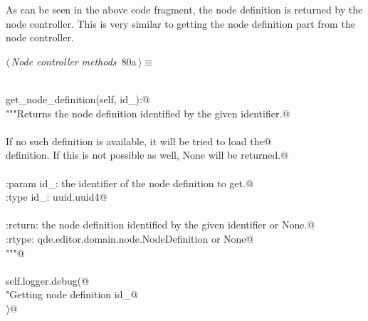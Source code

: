 \documentclass[
    a4paper,      %
    10pt,         %
    openright,    %
    notitlepage,  %
    parskip=half, %
]{scrreprt}       %
\theoremstyle{definition}                    %
\begin{document}
\begin{flushleft}
\begin{minipage}{\linewidth}
\begin{list}{}{\setlength{\itemsep}{-\parsep}\setlength{\itemindent}{-\leftmargin}}
\item{}
\end{list}
\end{minipage}\vspace{4ex}
\end{flushleft}
As can be seen in the above code fragment, the node definition is returned by
the node controller. This is very similar to getting the node definition part
from the node controller.

\begin{flushleft} \small
\begin{minipage}{\linewidth}\label{scrap131}\raggedright\small
{} $\langle\,${\itshape Node controller methods}\nobreak\ {\footnotesize {80a}}$\,\rangle\equiv$
\vspace{-1exm}
\begin{list}{}{} \item
\mbox{}\lstinline@@\\
\mbox{}\lstinline@def get_node_definition(self, id_):@\\
\mbox{}\lstinline@    """Returns the node definition identified by the given identifier.@\\
\mbox{}\lstinline@@\\
\mbox{}\lstinline@    If no such definition is available, it will be tried to load the@\\
\mbox{}\lstinline@    definition. If this is not possible as well, None will be returned.@\\
\mbox{}\lstinline@@\\
\mbox{}\lstinline@    :param id_: the identifier of the node definition to get.@\\
\mbox{}\lstinline@    :type  id_: uuid.uuid4@\\
\mbox{}\lstinline@@\\
\mbox{}\lstinline@    :return: the node definition identified by the given identifier or None.@\\
\mbox{}\lstinline@    :rtype:  qde.editor.domain.node.NodeDefinition or None@\\
\mbox{}\lstinline@    """@\\
\mbox{}\lstinline@@\\
\mbox{}\lstinline@    self.logger.debug(@\\
\mbox{}\lstinline@        "Getting node definition %s",@\\
\mbox{}\lstinline@        id_@\\
\mbox{}\lstinline@    )@\\
\mbox{}\lstinline@@\\

\end{list}
\end{minipage}
\end{flushleft}
\end{document}

